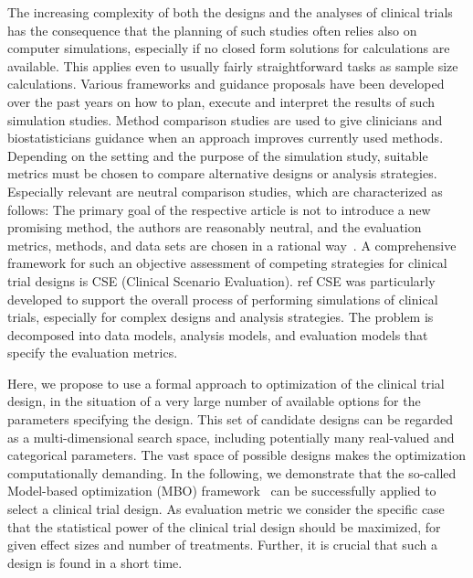 \documentclass[bimj,fleqn]{w-art}
\theoremstyle{plain}
\theoremstyle{definition}
\begin{document}
The increasing complexity of both the designs and the analyses of clinical trials has the consequence that the planning of such studies often relies also on computer simulations, especially if no closed form solutions for calculations are available.
This applies even to usually fairly straightforward tasks as sample size calculations. 
Various frameworks and guidance proposals have been developed over the past years on how to plan, execute and interpret the results of such simulation studies.
Method comparison studies are used to give clinicians and biostatisticians guidance when an approach improves currently used methods.  
Depending on the setting and the purpose of the simulation study, suitable metrics must be chosen to compare alternative designs or analysis strategies. 
Especially relevant are neutral comparison studies, which are characterized as follows:
The primary goal of the respective article is not to introduce a new promising method, the authors are reasonably neutral, and the evaluation metrics, methods, and data sets are chosen in a rational way~\citep{boulesteix_plea_2013}.
A comprehensive framework for such an objective assessment of competing strategies for clinical trial designs is CSE (Clinical Scenario Evaluation). ref %
CSE was particularly developed to support the overall process of performing simulations of clinical trials, especially for complex designs and analysis strategies.
The problem is decomposed into data models, analysis models, and evaluation models that specify the evaluation metrics.

Here, we propose to use a formal approach to optimization of the clinical trial design, in the situation of a very large number of available options for the parameters specifying the design. 
This set of candidate designs can be regarded as a multi-dimensional search space, including potentially many real-valued and categorical parameters.
The vast space of possible designs makes the optimization computationally demanding.
In the following, we demonstrate that the so-called Model-based optimization (MBO) framework~\citep{jones_taxonomy_2001} can be successfully applied to select a clinical trial design.
As evaluation metric we consider the specific case that the statistical power of the clinical trial design should be maximized, for given effect sizes and number of treatments.
Further, it is crucial that such a design is found in a short time.
\end{document}
